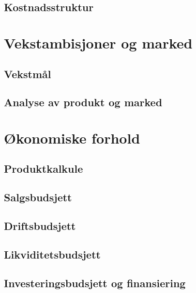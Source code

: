 \subsection{Kostnadsstruktur}

\section{Vekstambisjoner og marked}


\subsection{Vekstmål}

\subsection{Analyse av produkt og marked}

\section{Økonomiske forhold}

\subsection{Produktkalkule}

\subsection{Salgsbudsjett}

\subsection{Driftsbudsjett}

\subsection{Likviditetsbudsjett}

\subsection{Investeringsbudsjett og finansiering}

